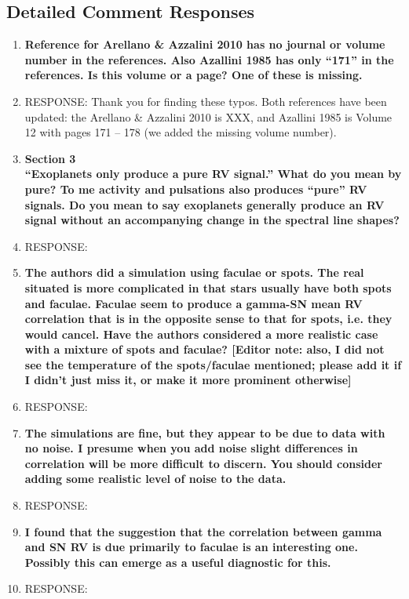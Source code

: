 \documentclass[11pt]{article}   	%
\begin{document}
\subsection{Detailed Comment Responses}

\begin{enumerate}
\item {\bf Reference for Arellano \& Azzalini 2010 has no journal or volume number in the references. Also Azallini 1985 has only ``171'' in the references. Is this volume or a page? One of these is missing.}
%
\item[]  RESPONSE:  Thank you for finding these typos.  Both references have been updated:  the Arellano \& Azzalini 2010 is XXX, and Azallini 1985 is Volume 12 with pages 171 -- 178 (we added the missing volume number).
\bigskip
%
%
\item {\bf Section 3 \\
``Exoplanets only produce a pure RV signal.'' What do you mean by pure? To me activity and pulsations also produces ``pure'' RV signals. Do you mean to say exoplanets generally produce an RV signal without an accompanying change in the spectral line shapes?}
%
\item[]  RESPONSE:  
\bigskip
%
%
\item {\bf The authors did a simulation using faculae or spots. The real situated is more complicated in that stars usually have both spots and faculae. Faculae seem to produce a gamma-SN mean RV correlation that is in the opposite sense to that for spots, i.e. they would cancel. Have the authors considered a more realistic case with a mixture of spots and faculae? [Editor note: also, I did not see the temperature of the spots/faculae mentioned; please add it if I didn't just miss it, or make it more prominent otherwise]}
%
\item[]  RESPONSE:  
\bigskip
%
%
\item {\bf The simulations are fine, but they appear to be due to data with no noise. I presume when you add noise slight differences in correlation will be more difficult to discern. You should consider adding some realistic level of noise to the data.}
%
\item[]  RESPONSE:  
\bigskip
%
%
\item {\bf I found that the suggestion that the correlation between gamma and SN RV is due primarily to faculae is an interesting one. Possibly this can emerge as a useful diagnostic for this.}
%
\item[]  RESPONSE:  
\bigskip
%
%

\end{enumerate}
\end{document}
